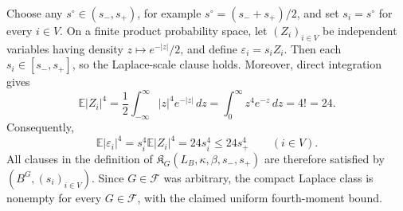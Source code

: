 Choose any \(s^{\circ}\in(s_-,s_+)\), for example \(s^{\circ}=(s_-+s_+)/2\), and set \(s_i=s^{\circ}\) for every \(i\in V\).  On a finite product probability space, let \((Z_i)_{i\in V}\) be independent variables having density \(z\mapsto e^{-|z|}/2\), and define \(\varepsilon_i=s_iZ_i\).  Then each \(s_i\in[s_-,s_+]\), so the Laplace-scale clause holds.  Moreover, direct integration gives
\[
 \mathbb E|Z_i|^4
 =\frac12\int_{-\infty}^{\infty}|z|^4e^{-|z|}\,dz
 =\int_0^{\infty}z^4e^{-z}\,dz
 =4!
 =24.
\]
Consequently,
\[
 \mathbb E|\varepsilon_i|^4
 =s_i^4\mathbb E|Z_i|^4
 =24s_i^4
 \le24s_+^4
 \qquad(i\in V).
\]
All clauses in the definition of \(\mathfrak K_G(L_B,\kappa,\beta,s_-,s_+)\) are therefore satisfied by \((B^{G},(s_i)_{i\in V})\).  Since \(G\in\mathcal F\) was arbitrary, the compact Laplace class is nonempty for every \(G\in\mathcal F\), with the claimed uniform fourth-moment bound.
